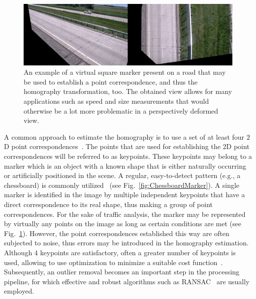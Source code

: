 \begin{figure}[t]
    \centerline{\includegraphics[width=\linewidth]{figures/homography/homography_road.png}}
    \caption[Square marker on a road]{An example of a virtual square marker present on a road that may be used to establish a point correspondence, and thus the homography transformation, too. The obtained view allows for many applications such as speed and size measurements that would otherwise be a lot more problematic in a perspectively deformed view. }
    \label{fig:RoadMarker}
\end{figure}

A common approach to estimate the homography is to use a set of at least four $2$D point correspondences~\cite{hartley1997defense}. The points that are used for establishing the $2$D point correspondences will be referred to as keypoints. These keypoints may belong to a marker which is an object with a known shape that is either naturally occurring or artificially positioned in the scene. A regular, easy-to-detect pattern (e.g., a chessboard) is commonly utilized~\cite{zhang2016flexible} (see Fig.~\ref{fig:ChessboardMarker}). A single marker is identified in the image by multiple independent keypoints that have a direct correspondence to its real shape, thus making a group of point correspondences. For the sake of traffic analysis, the marker may be represented by virtually any points on the image as long as certain conditions are met (see Fig.~\ref{fig:RoadMarker}). However, the point correspondences established this way are often subjected to noise, thus errors may be introduced in the homography estimation. Although $4$ keypoints are satisfactory, often a greater number of keypoints is used, allowing to use optimization to minimize a suitable cost function~\cite{osuna2016multiobjective, mou2013robust}. Subsequently, an outlier removal becomes an important step in the processing pipeline, for which effective and robust algorithms such as RANSAC~\cite{fischler1981random} are usually employed.


